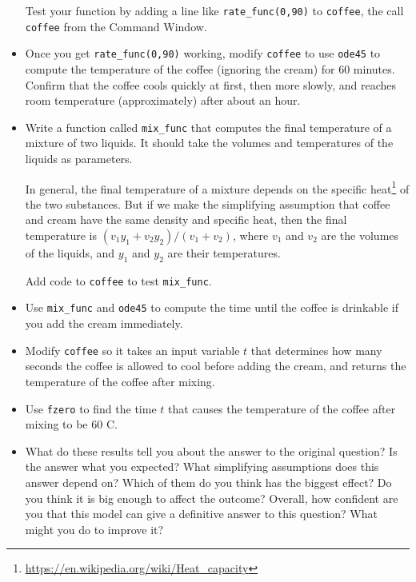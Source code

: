 \documentclass[
]{book}
\begin{document}
\begin{ex}
\begin{itemize}
Test your function by adding a line like {\tt rate\_func(0,90)}
to {\tt coffee}, the call {\tt coffee} from the Command Window.

\item Once you get {\tt rate\_func(0,90)} working, modify
{\tt coffee} to use {\tt ode45} to compute the temperature
of the coffee (ignoring the cream) for 60 minutes.  Confirm that
the coffee cools quickly at first, then more slowly, and reaches
room temperature (approximately) after about an hour.

\item Write a function called {\tt mix\_func} that computes
the final temperature of a mixture of two liquids.  It should
take the volumes and temperatures of the liquids as parameters.

In general, the final temperature of a mixture depends on the specific
heat\footnote{\url{https://en.wikipedia.org/wiki/Heat_capacity}}
of the two substances.  But if we make the simplifying
assumption that coffee and cream
have the same density and specific heat, then the final temperature is
$(v_1 y_1 + v_2 y_2) / (v_1 + v_2)$, where $v_1$ and $v_2$ are
the volumes of the liquids, and $y_1$ and $y_2$ are their
temperatures.

Add code to {\tt coffee} to test {\tt mix\_func}.

\item Use {\tt mix\_func} and {\tt ode45} to compute the
time until the coffee is drinkable if you add the cream
immediately.

\item Modify {\tt coffee} so it takes an input variable $t$ that
determines how many seconds the coffee is allowed to cool before
adding the cream, and returns the temperature of the coffee
after mixing.

\item Use {\tt fzero} to find the time $t$ that causes the
temperature of the coffee after mixing to be 60 \degree C.

\item What do these results tell you about the answer to the original
question?  Is the answer what you expected?  What simplifying
assumptions does this answer depend on?  Which of them do you think
has the biggest effect?  Do you think it is big enough to affect the
outcome?  Overall, how confident are you that this model can give
a definitive answer to this question?  What might you do to improve
it?

\end{itemize}

\end{ex}
\end{document}
